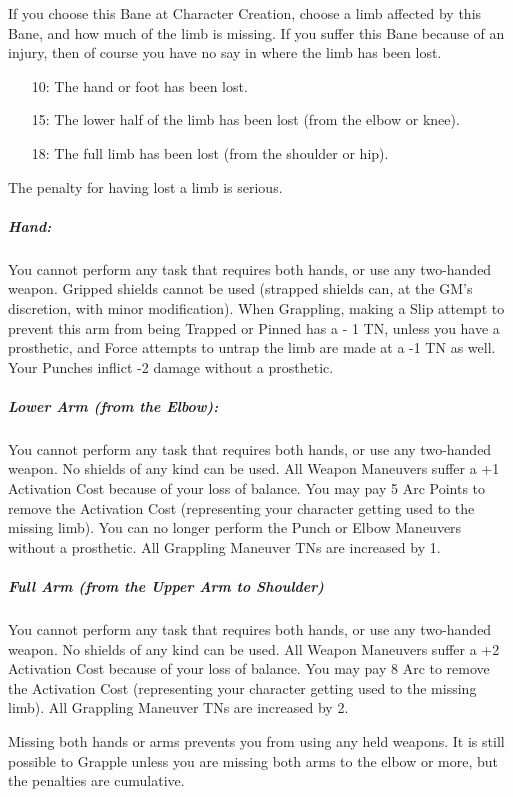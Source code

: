 \documentclass[oneside,11pt,english]{book}
\begin{document}
If you choose this Bane at Character Creation, choose a limb affected by this Bane, and how much of the limb is missing. If you suffer this Bane because of an injury, then of course you have no say in where the limb has been lost.
\begin{itemize}
	\item [10:] The hand or foot has been lost.
	\item [15:] The lower half of the limb has been lost (from the elbow or knee).
	\item [18:] The full limb has been lost (from the shoulder or hip).
\end{itemize}
The penalty for having lost a limb is serious.
\subparagraph*{Hand:}
You cannot perform any task that requires both hands, or use any two-handed weapon. Gripped 
shields cannot be used (strapped shields can, at the GM’s discretion, with minor modification). 
When Grappling, making a Slip attempt to prevent this arm from being Trapped or Pinned has a -
1 TN, unless you have a prosthetic, and Force attempts to untrap the limb are made at a -1 TN as 
well. Your Punches inflict -2 damage without a prosthetic. 
\subparagraph*{Lower Arm (from the Elbow):}
You cannot perform any task that requires both hands, or use any two-handed weapon. No shields 
of any kind can be used. All Weapon Maneuvers suffer a +1 Activation Cost because of your loss 
of balance. You may pay 5 Arc Points to remove the Activation Cost (representing your character 
getting used to the missing limb). You can no longer perform the Punch or Elbow Maneuvers 
without a prosthetic. All Grappling Maneuver TNs are increased by 1. 
\subparagraph*{Full Arm (from the Upper Arm to Shoulder)}
You cannot perform any task that requires both hands, or use any two-handed weapon. No shields 
of any kind can be used. All Weapon Maneuvers suffer a +2 Activation Cost because of your loss 
of balance. You may pay 8 Arc to remove the Activation Cost (representing your character 
getting used to the missing limb). All Grappling Maneuver TNs are increased by 2. 


Missing both hands or arms prevents you from using any held weapons. It is still possible to 
Grapple unless you are missing both arms to the elbow or more, but the penalties are cumulative. 
\end{document}
